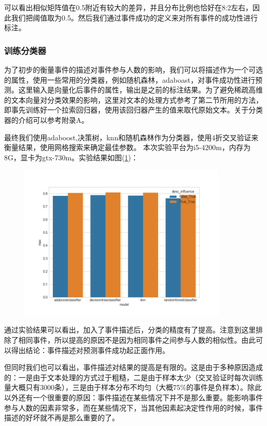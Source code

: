 可以看出相似矩阵值在0.5附近有较大的差异，并且分布比例也恰好在8:2左右，因此我们把阈值取为0.5。然后我们通过事件成功的定义来对所有事件的成功性进行标注。

\subsubsection{训练分类器}
为了初步的衡量事件的描述对事件参与人数的影响，我们可以将描述作为一个可选的属性，使用一些常用的分类器，例如随机森林，adaboast，对事件成功性进行预测。这里输入是向量化后事件的属性，输出是之前的标注结果。为了避免稀疏高维的文本向量对分类效果的影响，这里对文本的处理方式参考了第二节所用的方法，即事先训练好一个拉索回归器，使用该回归器产生的值来取代原始文本。关于分类器的介绍可以参考附录A。

最终我们使用adaboost,决策树，knn和随机森林作为分类器，使用4折交叉验证来衡量结果，使用网格搜索来确定最佳参数。
本次实验平台为i5-4200m，内存为8G，显卡为gtx-730m。实验结果如图(\ref{f3})：

\begin{figure}
\centering
\includegraphics[width=10cm]{exp4_with_1.png}
\caption{}
\label{f3}
\end{figure}

通过实验结果可以看出，加入了事件描述后，分类的精度有了提高。注意到这里排除了相同事件，所以提高的原因不是因为相同事件之间参与人数的相似性。由此可以得出结论：事件描述对预测事件成功起正面作用。

但同时我们也可以看出，事件描述对结果的提高是有限的。这是由于多种原因造成的：一是由于文本处理的方式过于粗糙，二是由于样本太少（交叉验证时每次训练量大概只有3000条），三是由于样本分布不均匀（大概75\%的事件是负样本）。除此以外还有一个很重要的原因：事件描述在某些情况下并不是那么重要。能影响事件参与人数的因素非常多，而在某些情况下，当其他因素起决定性作用的时候，事件描述的好坏就不再是那么重要的了。

